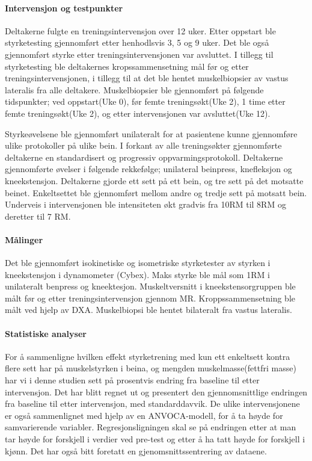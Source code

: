 \documentclass[
]{article}
\begin{document}
\hypertarget{intervensjon-og-testpunkter}{%
\paragraph{Intervensjon og
testpunkter}\label{intervensjon-og-testpunkter}}

Deltakerne fulgte en treningsintervensjon over 12 uker. Etter oppstart
ble styrketesting gjennomført etter henhodlsvis 3, 5 og 9 uker. Det ble
også gjennomført styrke etter treningsintervensjonen var avsluttet. I
tillegg til styrketesting ble deltakernes kropssammensetning mål før og
etter treningsintervensjonen, i tillegg til at det ble hentet
muskelbiopsier av vastus lateralis fra alle deltakere. Muskelbiopsier
ble gjennomført på følgende tidspunkter; ved oppstart(Uke 0), før femte
treningsøkt(Uke 2), 1 time etter femte treningsøkt(Uke 2), og etter
intervensjonen var avsluttet(Uke 12).

Styrkeøvelsene ble gjennomført unilateralt for at pasientene kunne
gjennomføre ulike protokoller på ulike bein. I forkant av alle
treningsøkter gjennomførte deltakerne en standardisert og progressiv
oppvarmingsprotokoll. Deltakerne gjennomførte øvelser i følgende
rekkefølge; unilateral beinpress, knefleksjon og kneekstensjon.
Deltakerne gjorde ett sett på ett bein, og tre sett på det motsatte
beinet. Enkeltsettet ble gjennomført mellom andre og tredje sett på
motsatt bein. Underveis i intervensjonen ble intensiteten økt gradvis
fra 10RM til 8RM og deretter til 7 RM.

\hypertarget{muxe5linger}{%
\paragraph{Målinger}\label{muxe5linger}}

Det ble gjennomført isokinetiske og isometriske styrketester av styrken
i kneekstensjon i dynamometer (Cybex). Maks styrke ble mål som 1RM i
unilateralt benpress og kneektesjon. Muskeltversnitt i
kneekstensorgruppen ble målt før og etter treningsintervensjon gjennom
MR. Kroppssammensetning ble målt ved hjelp av DXA. Muskelbiopsi ble
hentet bilateralt fra vastus lateralis.

\hypertarget{statistiske-analyser}{%
\paragraph{Statistiske analyser}\label{statistiske-analyser}}

For å sammenligne hvilken effekt styrketrening med kun ett enkeltsett
kontra flere sett har på muskelstyrken i beina, og mengden
muskelmasse(fettfri masse) har vi i denne studien sett på prosentvis
endring fra baseline til etter intervensjon. Det har blitt regnet ut og
presentert den gjennomsnittlige endringen fra baseline til etter
intervensjon, med standarddavvik. De ulike intervensjonene er også
sammenlignet med hjelp av en ANVOCA-modell, for å ta høyde for
samvarierende variabler. Regresjonsligningen skal se på endringen etter
at man tar høyde for forskjell i verdier ved pre-test og etter å ha tatt
høyde for forskjell i kjønn. Det har også bitt foretatt en
gjenomsnittssentrering av dataene.
\end{document}
